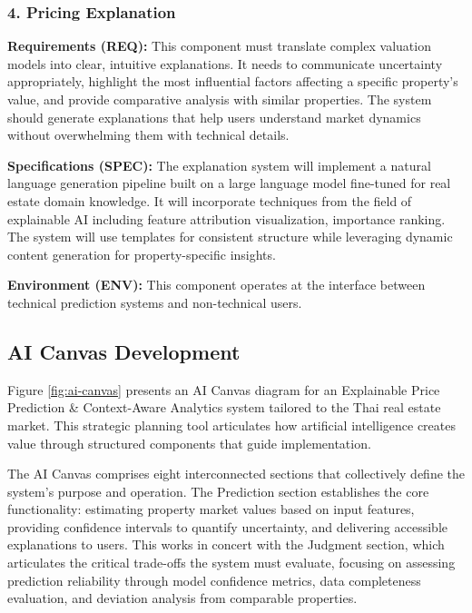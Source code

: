\subsubsection*{4. Pricing Explanation}

\textbf{Requirements (REQ):} This component must translate complex valuation models into clear, intuitive explanations. It needs to communicate uncertainty appropriately, highlight the most influential factors affecting a specific property's value, and provide comparative analysis with similar properties. The system should generate explanations that help users understand market dynamics without overwhelming them with technical details.

\textbf{Specifications (SPEC):} The explanation system will implement a natural language generation pipeline built on a large language model fine-tuned for real estate domain knowledge. It will incorporate techniques from the field of explainable AI including feature attribution visualization, importance ranking. The system will use templates for consistent structure while leveraging dynamic content generation for property-specific insights.

\textbf{Environment (ENV):} This component operates at the interface between technical prediction systems and non-technical users.

\newpage

\subsection{AI Canvas Development}

\noindent Figure \ref{fig:ai-canvas} presents an AI Canvas diagram for an Explainable Price Prediction \& Context-Aware Analytics system tailored to the Thai real estate market. This strategic planning tool articulates how artificial intelligence creates value through structured components that guide implementation.

The AI Canvas comprises eight interconnected sections that collectively define the system's purpose and operation. The Prediction section establishes the core functionality: estimating property market values based on input features, providing confidence intervals to quantify uncertainty, and delivering accessible explanations to users. This works in concert with the Judgment section, which articulates the critical trade-offs the system must evaluate, focusing on assessing prediction reliability through model confidence metrics, data completeness evaluation, and deviation analysis from comparable properties.


